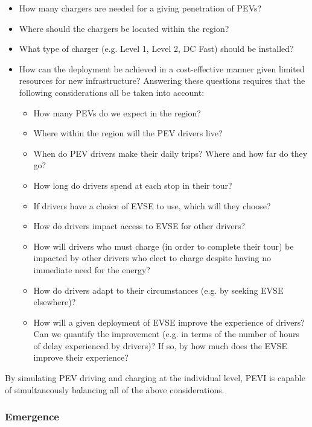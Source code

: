 \documentclass[journal]{IEEEtran}
\begin{document}
\begin{itemize}
  \item	How many chargers are needed for a giving penetration of PEVs?  
  \item	Where should the chargers be located within the region?  
  \item	What type of charger (e.g. Level 1, Level 2, DC Fast) should be installed?  
  \item	How can the deployment be achieved in a cost-effective manner given limited resources for new infrastructure?  
Answering these questions requires that the following considerations all be taken into account:
  \begin{itemize}
    \item	How many PEVs do we expect in the region?
    \item	Where within the region will the PEV drivers live?
    \item	When do PEV drivers make their daily trips?  Where and how far do they go?
    \item	How long do drivers spend at each stop in their tour?
    \item	If drivers have a choice of EVSE to use, which will they choose?
    \item	How do drivers impact access to EVSE for other drivers? 
    \item	How will drivers who must charge (in order to complete their tour) be impacted by other drivers who elect to charge despite having no immediate need for the energy?
    \item	How do drivers adapt to their circumstances (e.g. by seeking EVSE elsewhere)?
    \item	How will a given deployment of EVSE improve the experience of drivers?  Can we quantify the improvement (e.g. in terms of the number of hours of delay experienced by drivers)?  If so, by how much does the EVSE improve their experience?
  \end{itemize}
\end{itemize}

By simulating PEV driving and charging at the individual level, PEVI is capable of simultaneously balancing all of the above considerations. 

\subsubsection{Emergence}\label{emergence}
\end{document}
